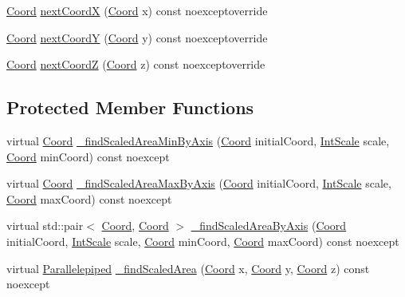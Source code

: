 \begin{DoxyCompactItemize}
\item 
\hyperlink{struct_coord}{Coord} \hyperlink{class_scalable_bound_temperature_world_ac384b72b9b471c9f185a0df45122456d}{next\-Coord\-X} (\hyperlink{struct_coord}{Coord} x) const noexceptoverride
\item 
\hyperlink{struct_coord}{Coord} \hyperlink{class_scalable_bound_temperature_world_a9cb3665784f5cd671736f85e6b7caac2}{next\-Coord\-Y} (\hyperlink{struct_coord}{Coord} y) const noexceptoverride
\item 
\hyperlink{struct_coord}{Coord} \hyperlink{class_scalable_bound_temperature_world_adbe49c210f9611beecf96a2e059f5330}{next\-Coord\-Z} (\hyperlink{struct_coord}{Coord} z) const noexceptoverride
\end{DoxyCompactItemize}
\subsection*{Protected Member Functions}
\begin{DoxyCompactItemize}
\item 
virtual \hyperlink{struct_coord}{Coord} \hyperlink{class_scalable_bound_temperature_world_ae8c72b04365794622707fa1a0101c73a}{\-\_\-find\-Scaled\-Area\-Min\-By\-Axis} (\hyperlink{struct_coord}{Coord} initial\-Coord, \hyperlink{struct_int_scale}{Int\-Scale} scale, \hyperlink{struct_coord}{Coord} min\-Coord) const noexcept
\item 
virtual \hyperlink{struct_coord}{Coord} \hyperlink{class_scalable_bound_temperature_world_ac77d4cc1f6df5ec994311915a5e92095}{\-\_\-find\-Scaled\-Area\-Max\-By\-Axis} (\hyperlink{struct_coord}{Coord} initial\-Coord, \hyperlink{struct_int_scale}{Int\-Scale} scale, \hyperlink{struct_coord}{Coord} max\-Coord) const noexcept
\item 
virtual std\-::pair$<$ \hyperlink{struct_coord}{Coord}, \hyperlink{struct_coord}{Coord} $>$ \hyperlink{class_scalable_bound_temperature_world_af4905396b44aec6b7d4efa46afda6919}{\-\_\-find\-Scaled\-Area\-By\-Axis} (\hyperlink{struct_coord}{Coord} initial\-Coord, \hyperlink{struct_int_scale}{Int\-Scale} scale, \hyperlink{struct_coord}{Coord} min\-Coord, \hyperlink{struct_coord}{Coord} max\-Coord) const noexcept
\item 
virtual \hyperlink{struct_parallelepiped}{Parallelepiped} \hyperlink{class_scalable_bound_temperature_world_a418f5c5ca361cea3cfc189ae22b35130}{\-\_\-find\-Scaled\-Area} (\hyperlink{struct_coord}{Coord} x, \hyperlink{struct_coord}{Coord} y, \hyperlink{struct_coord}{Coord} z) const noexcept
\end{DoxyCompactItemize}
